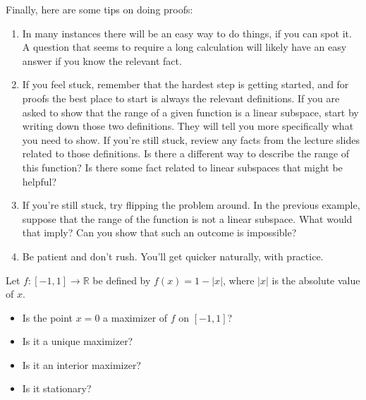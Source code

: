 \documentclass[letterpaper,10pt,english]{jupyterBook}
\begin{document}
\sphinxAtStartPar
Finally, here are some tips on doing proofs:
\begin{enumerate}
%
\item {} 
\sphinxAtStartPar
In many instances there will be an easy way to do things, if you can spot it. A question that seems to require a long calculation will likely have an easy answer if you know the relevant fact.

\item {} 
\sphinxAtStartPar
If you feel stuck, remember that the hardest step is getting started, and for proofs the best place to start is always the relevant deﬁnitions. If you are asked to show that the range of a given function is a linear subspace, start by writing down those two deﬁnitions. They will tell you more speciﬁcally what you need to show. If you’re still stuck, review any facts from the lecture slides related to those deﬁnitions. Is there a different way to describe the range of this function? Is there some fact related to linear subspaces that might be helpful?

\item {} 
\sphinxAtStartPar
If you’re still stuck, try ﬂipping the problem around. In the previous example, suppose that the range of the function is not a linear subspace. What would that imply? Can you show that such an outcome is impossible?

\item {} 
\sphinxAtStartPar
Be patient and don’t rush. You’ll get quicker naturally, with practice.

\end{enumerate}

\sphinxAtStartPar
{}

\sphinxAtStartPar
Let \(f \colon [-1, 1] \to \mathbb{R}\) be defined by \(f(x) = 1 - |x|\), where \(|x|\) is the absolute value of \(x\).
\begin{itemize}
\item {} 
\sphinxAtStartPar
Is the point \(x = 0\) a maximizer of \(f\) on \([-1, 1]\)?

\item {} 
\sphinxAtStartPar
Is it a unique maximizer?

\item {} 
\sphinxAtStartPar
Is it an interior maximizer?

\item {} 
\sphinxAtStartPar
Is it stationary?

\end{itemize}
\end{document}

